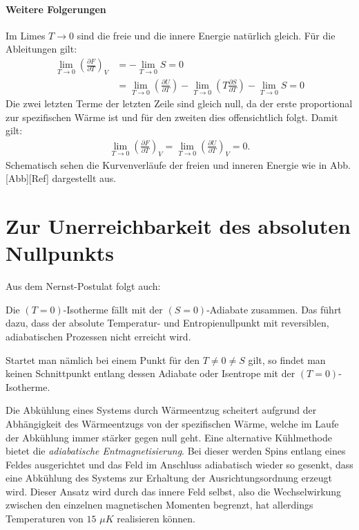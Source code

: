 \paragraph*{Weitere Folgerungen}
Im Limes $T\rightarrow 0$ sind die freie und die innere Energie natürlich gleich.
Für die Ableitungen gilt:
\begin{align*}
    \lim_{T\rightarrow 0}\left(\frac{\partial F}{\partial T} \right)_V&=-\lim_{T\rightarrow 0}S=0\\
    &=\lim_{T\rightarrow 0}\left(\frac{\partial U}{\partial T}\right)-\lim_{T\rightarrow 0}\left(T\frac{\partial S}{\partial T}\right)-\lim_{T\rightarrow 0} S=0
\end{align*}
Die zwei letzten Terme der letzten Zeile sind gleich null, da der erste proportional zur spezifischen Wärme ist und für den zweiten dies offensichtlich folgt. Damit gilt:
\begin{align*}
    \lim_{T\rightarrow 0}\left(\frac{\partial F}{\partial T}\right)_V=\lim_{T\rightarrow 0}\left(\frac{\partial U}{\partial T}\right)_V=0.
\end{align*}
Schematisch sehen die Kurvenverläufe der freien und inneren Energie wie in Abb. [Abb][Ref] dargestellt aus.
\section{Zur Unerreichbarkeit des absoluten Nullpunkts}
Aus dem Nernst-Postulat folgt auch:
\begin{formal}
    Die $\left(T=0\right)$-Isotherme fällt mit der $\left(S=0\right)$-Adiabate zusammen. Das führt dazu, dass der absolute Temperatur- und Entropienullpunkt mit reversiblen, adiabatischen Prozessen nicht erreicht wird.
\end{formal}
Startet man nämlich bei einem Punkt für den $T\neq 0\neq S$ gilt, so findet man keinen Schnittpunkt entlang dessen Adiabate oder Isentrope mit der $\left(T=0\right)$-Isotherme.  

Die Abkühlung eines Systems durch Wärmeentzug scheitert aufgrund der Abhängigkeit des Wärmeentzugs von der spezifischen Wärme, welche im Laufe der Abkühlung immer stärker gegen null geht. 
Eine alternative Kühlmethode bietet die \emph{adiabatische Entmagnetisierung}. Bei dieser werden Spins entlang eines Feldes ausgerichtet und das Feld im Anschluss adiabatisch wieder so gesenkt, dass eine Abkühlung des Systems zur Erhaltung der Ausrichtungsordnung erzeugt wird. Dieser Ansatz wird durch das innere Feld selbst, also die Wechselwirkung zwischen den einzelnen magnetischen Momenten begrenzt, hat allerdings Temperaturen von $15$ $\mu K$ realisieren können.

